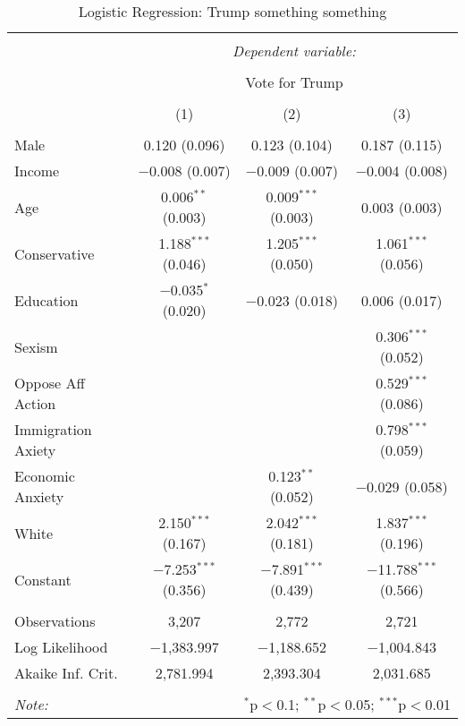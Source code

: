 
\begin{table}[!htbp] \centering 
  \caption{Logistic Regression: Trump something something} 
  \label{tab: regs} 
\begin{tabular}{@{\extracolsep{5pt}}lccc} 
\\[-1.8ex]\hline 
\hline \\[-1.8ex] 
 & \multicolumn{3}{c}{\textit{Dependent variable:}} \\ 
\cline{2-4} 
\\[-1.8ex] & \multicolumn{3}{c}{Vote for Trump} \\ 
\\[-1.8ex] & (1) & (2) & (3)\\ 
\hline \\[-1.8ex] 
 Male & 0.120 (0.096) & 0.123 (0.104) & 0.187 (0.115) \\ 
  Income & $-$0.008 (0.007) & $-$0.009 (0.007) & $-$0.004 (0.008) \\ 
  Age & 0.006$^{**}$ (0.003) & 0.009$^{***}$ (0.003) & 0.003 (0.003) \\ 
  Conservative & 1.188$^{***}$ (0.046) & 1.205$^{***}$ (0.050) & 1.061$^{***}$ (0.056) \\ 
  Education & $-$0.035$^{*}$ (0.020) & $-$0.023 (0.018) & 0.006 (0.017) \\ 
  Sexism &  &  & 0.306$^{***}$ (0.052) \\ 
  Oppose Aff Action &  &  & 0.529$^{***}$ (0.086) \\ 
  Immigration Axiety &  &  & 0.798$^{***}$ (0.059) \\ 
  Economic Anxiety &  & 0.123$^{**}$ (0.052) & $-$0.029 (0.058) \\ 
  White & 2.150$^{***}$ (0.167) & 2.042$^{***}$ (0.181) & 1.837$^{***}$ (0.196) \\ 
  Constant & $-$7.253$^{***}$ (0.356) & $-$7.891$^{***}$ (0.439) & $-$11.788$^{***}$ (0.566) \\ 
 \hline \\[-1.8ex] 
Observations & 3,207 & 2,772 & 2,721 \\ 
Log Likelihood & $-$1,383.997 & $-$1,188.652 & $-$1,004.843 \\ 
Akaike Inf. Crit. & 2,781.994 & 2,393.304 & 2,031.685 \\ 
\hline 
\hline \\[-1.8ex] 
\textit{Note:}  & \multicolumn{3}{r}{$^{*}$p$<$0.1; $^{**}$p$<$0.05; $^{***}$p$<$0.01} \\ 
\end{tabular} 
\end{table} 
